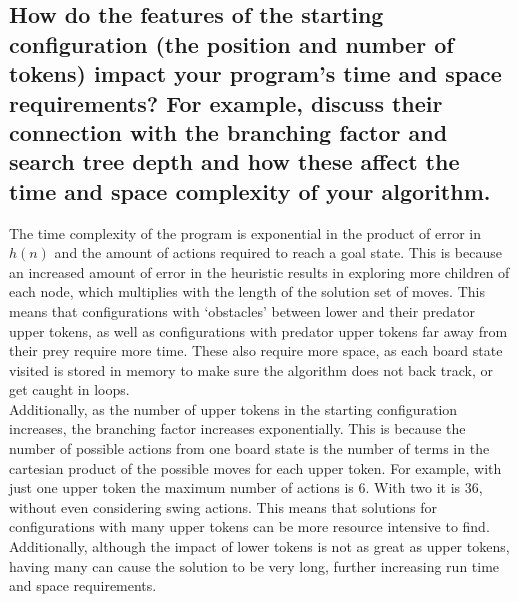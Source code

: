 \documentclass{article}
\begin{document}
\subsection*{How do the features of the starting configuration (the position and number of tokens) impact your program’s time and space requirements? For example, discuss their connection with the branching factor and search tree depth and how these affect the time and space complexity of your algorithm.}
The time complexity of the program is exponential in the product of error in $h(n)$ and the amount of actions required to reach a goal state. This is because an increased amount of error in the heuristic results in exploring more children of each node, which multiplies with the length of the solution set of moves. This means that configurations with ‘obstacles’ between lower and their predator upper tokens, as well as configurations with predator upper tokens far away from their prey require more time. These also require more space, as each board state visited is stored in memory to make sure the algorithm does not back track, or get caught in loops.\\[2mm]
Additionally, as the number of upper tokens in the starting configuration increases, the branching factor increases exponentially. This is because the number of possible actions from one board state is the number of terms in the cartesian product of the possible moves for each upper token. For example, with just one upper token the maximum number of actions is 6. With two it is 36, without even considering swing actions. This means that solutions for configurations with many upper tokens can be more resource intensive to find. Additionally, although the impact of lower tokens is not as great as upper tokens, having many can cause the solution to be very long, further increasing run time and space requirements.
\end{document}
